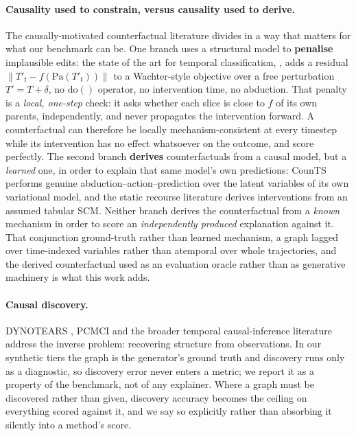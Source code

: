 \documentclass{article}
\newcommand{\Pa}{\mathrm{Pa}}
\newcommand{\dop}{\mathrm{do}}
\begin{document}
\paragraph{Causality used to constrain, versus causality used to derive.}
The causally-motivated counterfactual literature divides in a way that matters for what our benchmark can be. One branch uses a structural model to \textbf{penalise} implausible edits: the state of the art for temporal classification, \citet{bahri2025causalfeasibility}, adds a residual
$\lVert T'_t - f(\Pa(T'_t))\rVert$ to a Wachter-style objective over a free perturbation $T' = T + \delta$, no $\dop()$ operator, no intervention time, no abduction. That penalty is a \emph{local, one-step} check: it asks whether each slice is close to $f$ of its own parents, independently, and never propagates the intervention forward. A counterfactual can therefore be locally mechanism-consistent at every timestep while its intervention has no effect whatsoever on the outcome, and score perfectly. The second branch \textbf{derives} counterfactuals from a causal model, but a \emph{learned} one, in order to explain that same model's own predictions: CounTS \citep{yan2023counts} performs genuine abduction--action--prediction over the latent variables of its own variational model, and the static recourse literature \citep{karimi2021recourse} derives interventions from an assumed tabular SCM. Neither branch derives the counterfactual from a \emph{known} mechanism in order to score an \emph{independently produced} explanation against it. That conjunction ground-truth rather than learned mechanism, a graph lagged over time-indexed variables rather than atemporal over whole trajectories, and the derived counterfactual used as an evaluation oracle rather than as generative machinery is what this work adds.

\paragraph{Causal discovery.}
DYNOTEARS \citep{pamfil2020dynotears}, PCMCI \citep{runge2019pcmci} and the broader temporal causal-inference literature \citep{runge2023causal,lippe2022citris,song2024ctrlns} address the inverse problem: recovering structure from observations. In our synthetic tiers the graph is the generator's ground truth and discovery runs only as a diagnostic, so discovery error never enters a metric; we report it as a property of the benchmark, not of any explainer. Where a graph must be discovered rather than given, discovery accuracy becomes the ceiling on everything scored against it, and we say so explicitly rather than absorbing it silently into a method's score.
\end{document}
